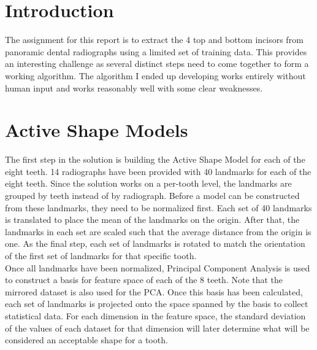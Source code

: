 \documentclass[a4paper,10pt]{article}
\begin{document}



\newpage
\section{Introduction}
The assignment for this report is to extract the 4 top and bottom incisors from panoramic dental radiographs using a limited set of training data. This provides an interesting challenge as several distinct steps need to come together to form a working algorithm. The algorithm I ended up developing works entirely without human input and works reasonably well with some clear weaknesses.

\section{Active Shape Models}
The first step in the solution is building the Active Shape Model for each of the eight teeth. 14 radiographs have been provided with 40 landmarks for each of the eight teeth. Since the solution works on a per-tooth level, the landmarks are grouped by teeth instead of by radiograph. Before a model can be constructed from these landmarks, they need to be normalized first. Each set of 40 landmarks is translated to place the mean of the landmarks on the origin. After that, the landmarks in each set are scaled such that the average distance from the origin is one. As the final step, each set of landmarks is rotated to match the orientation of the first set of landmarks for that specific tooth.
\\
Once all landmarks have been normalized, Principal Component Analysis is used to construct a basis for feature space of each of the 8 teeth. Note that the mirrored dataset is also used for the PCA. Once this basis has been calculated, each set of landmarks is projected onto the space spanned by the basis to collect statistical data. For each dimension in the feature space, the standard deviation of the values of each dataset for that dimension will later determine what will be considered an acceptable shape for a tooth.
\end{document}
